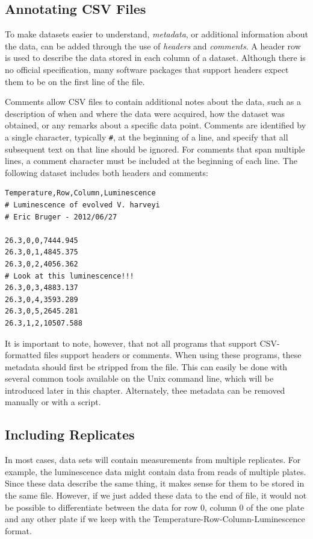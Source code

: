 \subsection{Annotating CSV Files}

To make datasets easier to understand, \emph{metadata}, or additional
information about the data, can be added through the use of
\emph{headers} and \emph{comments}. A header row is used to describe the
data stored in each column of a dataset. Although there is no official
specification, many software packages that support headers expect them
to be on the first line of the file.

Comments allow CSV files to contain additional notes about the data,
such as a description of when and where the data were acquired, how the
dataset was obtained, or any remarks about a specific data point.
Comments are identified by a single character, typically \lstinline!#!,
at the beginning of a line, and specify that all subsequent text on that
line should be ignored. For comments that span multiple lines, a comment
character must be included at the beginning of each line. The following
dataset includes both headers and comments:

\begin{lstlisting}
Temperature,Row,Column,Luminescence
# Luminescence of evolved V. harveyi
# Eric Bruger - 2012/06/27

26.3,0,0,7444.945
26.3,0,1,4845.375
26.3,0,2,4056.362
# Look at this luminescence!!!
26.3,0,3,4883.137
26.3,0,4,3593.289
26.3,0,5,2645.281
26.3,1,2,10507.588
\end{lstlisting}
It is important to note, however, that not all programs that support
CSV-formatted files support headers or comments. When using these
programs, these metadata should first be stripped from the file. This
can easily be done with several common tools available on the Unix
command line, which will be introduced later in this chapter.
Alternately, thee metadata can be removed manually or with a script.

\subsection{Including Replicates}

In most cases, data sets will contain measurements from multiple
replicates. For example, the luminescence data might contain data from
reads of multiple plates. Since these data describe the same thing, it
makes sense for them to be stored in the same file. However, if we just
added these data to the end of file, it would not be possible to
differentiate between the data for row 0, column 0 of the one plate and
any other plate if we keep with the Temperature-Row-Column-Luminescence
format.


